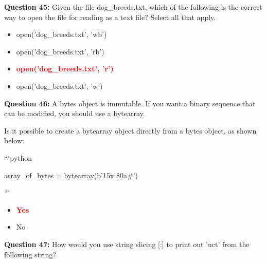 \documentclass[12pt,a4paper]{article}
\begin{document}
\vspace{0.5cm}

\textbf{Question 45:} Given the file dog_breeds.txt, which of the following is the correct way to open the file for reading as a text file? Select all that apply.

\begin{itemize}
    \item[\textbf{A.}] open('dog_breeds.txt', 'wb')
    \item[\textbf{B.}] open('dog_breeds.txt', 'rb')
    \item[\textbf{C.}] \textcolor{red}{\textbf{open('dog_breeds.txt', 'r')}}
    \item[\textbf{D.}] open('dog_breeds.txt', 'w')
\end{itemize}

\vspace{0.5cm}

\textbf{Question 46:} A bytes object is immutable. If you want a binary sequence that can be modified, you should use a bytearray.\newline

\newline
\newline

\newline
Is it possible to create a bytearray object directly from a bytes object, as shown below:\newline

\newline
\newline

\newline
```python\newline

\newline
array_of_bytes = bytearray(b'15x 80a#')\newline

\newline
```

\begin{itemize}
    \item[\textbf{A.}] \textcolor{red}{\textbf{Yes}}
    \item[\textbf{B.}] No
\end{itemize}

\vspace{0.5cm}

\textbf{Question 47:} How would you use string slicing [:] to print out 'uct' from the following string?\newline
\end{document}

